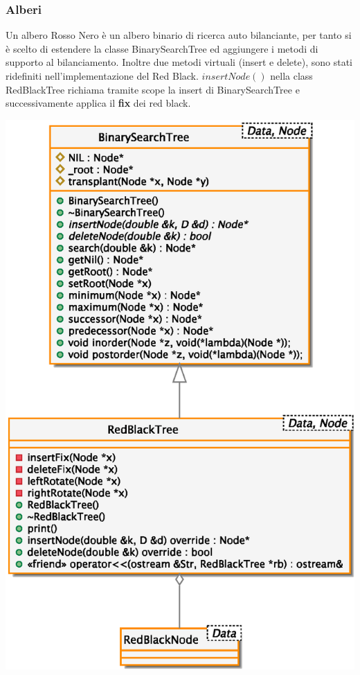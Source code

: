 \subsubsection{Alberi}
Un albero Rosso Nero \`e un albero binario di ricerca auto
bilanciante, per tanto si \`e scelto di estendere la classe
BinarySearchTree ed aggiungere i metodi di supporto al bilanciamento. Inoltre due metodi virtuali (insert e delete), sono
stati ridefiniti nell'implementazione del Red Black.
\textit{$insertNode()$} nella class RedBlackTree richiama tramite scope la insert
di BinarySearchTree e successivamente applica il
\textbf{fix} dei red black.
\begin{center}
\includegraphics[scale=0.7]{src/rbhash/2img/trees.eps}
\end{center}
